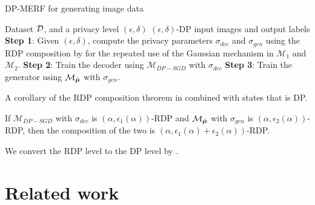 \documentclass{article}
\begin{document}
\begin{algorithm}[ht]
\caption{DP-MERF for generating image data}\label{algo:rf_ME_image}
\begin{algorithmic}
\vspace{0.1cm}
\REQUIRE Dataset $\mathcal{D}$, and a privacy level $(\epsilon, \delta)$
\vspace{0.1cm}
\ENSURE $(\epsilon, \delta)$-DP input images and output labels\\
\STATE  \textbf{Step 1}: Given $(\epsilon, \delta)$, compute the privacy parameters $\sigma_{dec}$ and $\sigma_{gen}$ using the RDP composition by \cite{pmlr-v89-wang19b} for the repeated use of the Gaussian mechanism in $\mathcal{M}_1$ and $\mathcal{M}_2$. %
\STATE  \textbf{Step 2}: Train the decoder using $\mathcal{M}_{DP-SGD}$ with $\sigma_{dec}$
\STATE  \textbf{Step 3}: Train the generator using $\mathcal{M}_{\hat{\mathbf{\bm{\mu}}}}$ with  $\sigma_{gen}$.
\end{algorithmic}
\end{algorithm}


A corollary of the RDP composition theorem in  combined with  states that  is DP.
\begin{cor}
If $\mathcal{M}_{DP-SGD}$ with $\sigma_{dec}$ is $(\alpha, \epsilon_1(\alpha))$-RDP and 
$\mathcal{M}_{\hat{\mathbf{\bm{\mu}}}}$ with $\sigma_{gen}$ is $(\alpha, \epsilon_2(\alpha))$-RDP,
then the composition of  the two is  $(\alpha, \epsilon_1(\alpha)+\epsilon_2(\alpha))$-RDP.
\end{cor}
We convert the RDP level to the DP level by . 



\section{Related work}
\label{sec:related_work}

\end{document}
